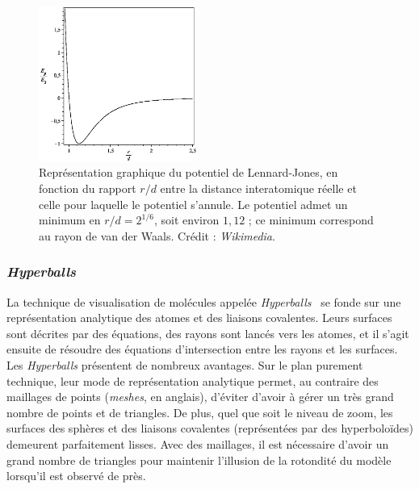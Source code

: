 \begin{appendices}
 	\begin{figure}[!htbp]
 		\centering
 		\includegraphics[width=0.46\textwidth]{figures/ch1/lennard-jones}
		\caption[Représentation graphique du potentiel de Lennard-Jones]{Représentation graphique du potentiel de Lennard-Jones, en fonction du rapport $r/d$ entre la distance interatomique réelle et celle pour laquelle le potentiel s'annule. Le potentiel admet un minimum en $r/d = 2^{1/6}$, soit environ $1,12$ ; ce minimum correspond au rayon de van der Waals. Crédit : \emph{Wikimedia}.}
 		\label{fig:lennard}
 	\end{figure}
	
	\subsubsection{\emph{Hyperballs}} La technique de visualisation de molécules appelée \emph{Hyperballs}~\cite{chavent2011gpu} se fonde sur une représentation analytique des atomes et des liaisons covalentes. Leurs surfaces sont décrites par des équations, des rayons sont lancés vers les atomes, et il s'agit ensuite de résoudre des équations d'intersection entre les rayons et les surfaces. Les \emph{Hyperballs} présentent de nombreux avantages. Sur le plan purement technique, leur mode de représentation analytique permet, au contraire des maillages de points (\emph{meshes}, en anglais), d'éviter d'avoir à gérer un très grand nombre de points et de triangles. De plus, quel que soit le niveau de zoom, les surfaces des sphères et des liaisons covalentes (représentées par des hyperboloïdes) demeurent parfaitement lisses. Avec des maillages, il est nécessaire d'avoir un grand nombre de triangles pour maintenir l'illusion de la rotondité du modèle lorsqu'il est observé de près.
	

\end{appendices}
